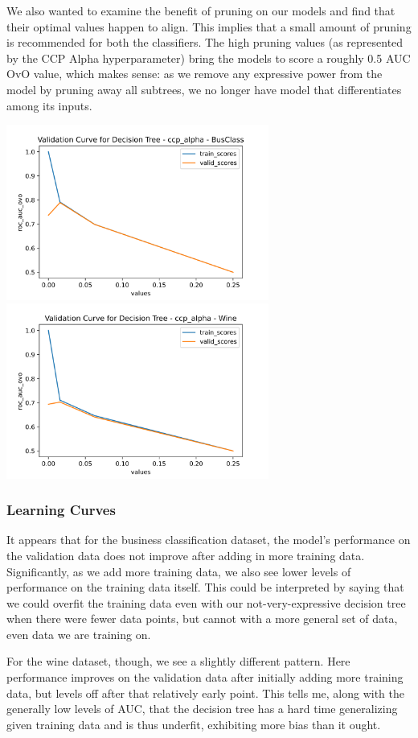 \documentclass[
	letterpaper, %
]{jdf}
\begin{document}
We also wanted to examine the benefit of pruning on our models and find that their optimal values happen to align. This implies that a small amount of pruning is recommended for both the classifiers. The high pruning values (as represented by the CCP Alpha hyperparameter) bring the models to score a roughly 0.5 AUC OvO value, which makes sense: as we remove any expressive power from the model by pruning away all subtrees, we no longer have model that differentiates among its inputs.

\includegraphics[width=3.4in]{Figures/BusClass-0920/DT/val_curve_1.png}
\includegraphics[width=3.4in]{Figures/Wine-0921/DT/val_curve_1.png}

\subsubsection{Learning Curves}
It appears that for the business classification dataset, the model's performance on the validation data does not improve after adding in more training data. Significantly, as we add more training data, we also see lower levels of performance on the training data itself. This could be interpreted by saying that we could overfit the training data even with our not-very-expressive decision tree when there were fewer data points, but cannot with a more general set of data, even data we are training on.

For the wine dataset, though, we see a slightly different pattern. Here performance improves on the validation data after initially adding more training data, but levels off after that relatively early point. This tells me, along with the generally low levels of AUC, that the decision tree has a hard time generalizing given training data and is thus underfit, exhibiting more bias than it ought.
\end{document}
